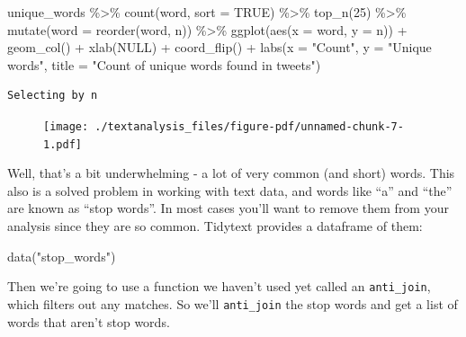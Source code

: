 \documentclass[
  letterpaper,
  DIV=11,
  numbers=noendperiod]{scrreprt}
\newenvironment{Shaded}{\begin{snugshade}}{\end{snugshade}}
\newcommand{\AttributeTok}[1]{\textcolor[rgb]{0.40,0.45,0.13}{#1}}
\newcommand{\ConstantTok}[1]{\textcolor[rgb]{0.56,0.35,0.01}{#1}}
\newcommand{\DecValTok}[1]{\textcolor[rgb]{0.68,0.00,0.00}{#1}}
\newcommand{\FunctionTok}[1]{\textcolor[rgb]{0.28,0.35,0.67}{#1}}
\newcommand{\NormalTok}[1]{\textcolor[rgb]{0.00,0.23,0.31}{#1}}
\newcommand{\SpecialCharTok}[1]{\textcolor[rgb]{0.37,0.37,0.37}{#1}}
\newcommand{\StringTok}[1]{\textcolor[rgb]{0.13,0.47,0.30}{#1}}
\begin{document}
\begin{Shaded}
\begin{Highlighting}[]
\NormalTok{unique\_words }\SpecialCharTok{\%\textgreater{}\%}
  \FunctionTok{count}\NormalTok{(word, }\AttributeTok{sort =} \ConstantTok{TRUE}\NormalTok{) }\SpecialCharTok{\%\textgreater{}\%}
  \FunctionTok{top\_n}\NormalTok{(}\DecValTok{25}\NormalTok{) }\SpecialCharTok{\%\textgreater{}\%}
  \FunctionTok{mutate}\NormalTok{(}\AttributeTok{word =} \FunctionTok{reorder}\NormalTok{(word, n)) }\SpecialCharTok{\%\textgreater{}\%}
  \FunctionTok{ggplot}\NormalTok{(}\FunctionTok{aes}\NormalTok{(}\AttributeTok{x =}\NormalTok{ word, }\AttributeTok{y =}\NormalTok{ n)) }\SpecialCharTok{+}
  \FunctionTok{geom\_col}\NormalTok{() }\SpecialCharTok{+}
  \FunctionTok{xlab}\NormalTok{(}\ConstantTok{NULL}\NormalTok{) }\SpecialCharTok{+}
  \FunctionTok{coord\_flip}\NormalTok{() }\SpecialCharTok{+}
      \FunctionTok{labs}\NormalTok{(}\AttributeTok{x =} \StringTok{"Count"}\NormalTok{,}
      \AttributeTok{y =} \StringTok{"Unique words"}\NormalTok{,}
      \AttributeTok{title =} \StringTok{"Count of unique words found in tweets"}\NormalTok{)}
\end{Highlighting}
\end{Shaded}

\begin{verbatim}
Selecting by n
\end{verbatim}

\begin{figure}[H]

{\centering \texttt{[image: ./textanalysis\_files/figure-pdf/unnamed-chunk-7-1.pdf]}

}

\end{figure}

Well, that's a bit underwhelming - a lot of very common (and short)
words. This also is a solved problem in working with text data, and
words like ``a'' and ``the'' are known as ``stop words''. In most cases
you'll want to remove them from your analysis since they are so common.
Tidytext provides a dataframe of them:

\begin{Shaded}
\begin{Highlighting}[]
\FunctionTok{data}\NormalTok{(}\StringTok{"stop\_words"}\NormalTok{)}
\end{Highlighting}
\end{Shaded}

Then we're going to use a function we haven't used yet called an
\texttt{anti\_join}, which filters out any matches. So we'll
\texttt{anti\_join} the stop words and get a list of words that aren't
stop words.
\end{document}
